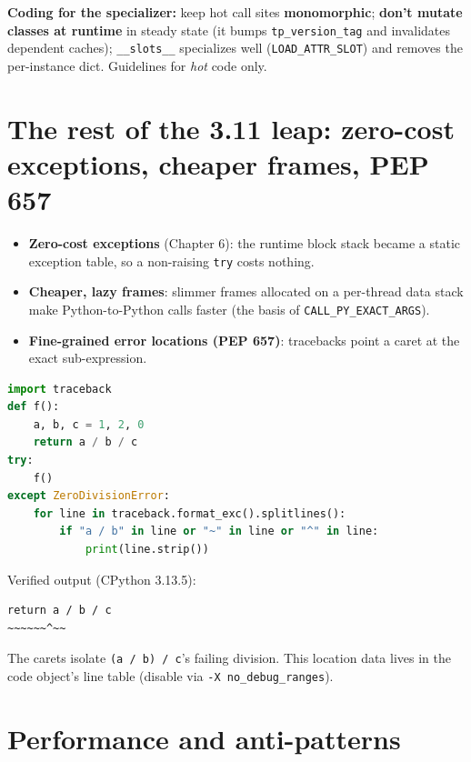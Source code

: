\textbf{Coding for the specializer:} keep hot call sites \textbf{monomorphic}; \textbf{don't mutate
classes at runtime} in steady state (it bumps \texttt{tp\_version\_tag} and invalidates dependent
caches); \texttt{\_\_slots\_\_} specializes well (\texttt{LOAD\_ATTR\_SLOT}) and removes the
per-instance dict. Guidelines for \emph{hot} code only.

\section{The rest of the 3.11 leap: zero-cost exceptions, cheaper frames, PEP 657}

\begin{itemize}
  \item \textbf{Zero-cost exceptions} (Chapter 6): the runtime block stack became a static exception
    table, so a non-raising \texttt{try} costs nothing.
  \item \textbf{Cheaper, lazy frames}: slimmer frames allocated on a per-thread data stack make
    Python-to-Python calls faster (the basis of \texttt{CALL\_PY\_EXACT\_ARGS}).
  \item \textbf{Fine-grained error locations (PEP 657)}: tracebacks point a caret at the exact
    sub-expression.
\end{itemize}

\begin{lstlisting}[language=Python, caption={PEP 657 --- the traceback marks which sub-expression raised.}]
import traceback
def f():
    a, b, c = 1, 2, 0
    return a / b / c
try:
    f()
except ZeroDivisionError:
    for line in traceback.format_exc().splitlines():
        if "a / b" in line or "~" in line or "^" in line:
            print(line.strip())
\end{lstlisting}

Verified output (CPython 3.13.5):

\begin{lstlisting}[caption={Output}]
return a / b / c
~~~~~~^~~
\end{lstlisting}

The carets isolate \texttt{(a / b) / c}'s failing division. This location data lives in the code
object's line table (disable via \texttt{-X no\_debug\_ranges}).

\section{Performance and anti-patterns}

